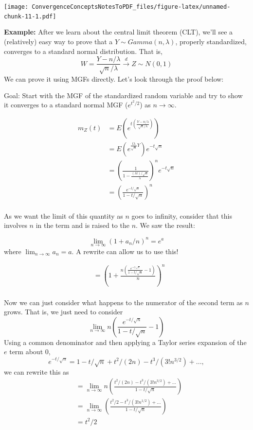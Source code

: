 \documentclass[
]{article}
\begin{document}
\texttt{[image: ConvergenceConceptsNotesToPDF\_files/figure-latex/unnamed-chunk-11-1.pdf]}

\textbf{Example:} After we learn about the central limit theorem (CLT),
we'll see a (relatively) easy way to prove that a
\(Y\sim Gamma(n, \lambda)\), properly standardized, converges to a
standard normal distribution. That is,
\[W = \frac{Y-n/\lambda}{\sqrt{n}/\lambda}\stackrel{d}{\rightarrow} Z \sim N(0,1)\]
We can prove it using MGFs directly. Let's look through the proof below:

Goal: Start with the MGF of the standardized random variable and try to
show it converges to a standard normal MGF (\(e^{t^2/2}\)) as
\(n\rightarrow\infty\).

\begin{align*} 
m_Z(t) &= E\left(e^{t\left(\frac{Y-n/\lambda}{\sqrt{n}/\lambda}\right)}\right)\\
       &= E\left(e^{\frac{t\lambda}{\sqrt{n}}Y}\right)e^{-t\sqrt{n}}\\
       &= \left(\frac{1}{1-\frac{(\lambda t)/\sqrt{n}}{\lambda}}\right)^{n}e^{-t\sqrt{n}}\\
       &= \left(\frac{e^{-t/\sqrt{n}}}{1-t/\sqrt{n}}\right)^{n}\\
\end{align*}

As we want the limit of this quantity as \(n\) goes to infinity,
consider that this involves \(n\) in the term and is raised to the
\(n\). We saw the result:

\[\lim_{n\rightarrow\infty}(1+a_n/n)^n=e^a\] where
\(\lim_{n\rightarrow\infty}a_n=a\). A rewrite can allow us to use this!

\begin{align*}
      &= \left(1+\frac{n\left(\frac{e^{-t/\sqrt{n}}}{1-t/\sqrt{n}}-1\right)}{n}\right)^{n}\\
\end{align*}

Now we can just consider what happens to the numerator of the second
term as \(n\) grows. That is, we just need to consider
\[\lim_{n\rightarrow\infty}n\left(\frac{e^{-t/\sqrt{n}}}{1-t/\sqrt{n}}-1\right)\]
Using a common denominator and then applying a Taylor series expansion
of the \(e\) term about 0,
\[e^{-t/\sqrt{n}}=1-t/\sqrt{n}+t^2/(2n)-t^3/(3!n^{3/2})+...,\] we can
rewrite this as \begin{align*}
    &= \lim_{n\rightarrow\infty}n\left(\frac{t^2/(2n)-t^3/(3!n^{3/2})+...}{1-t/\sqrt{n}}\right)\\
    &= \lim_{n\rightarrow\infty}\left(\frac{t^2/2-t^3/(3!n^{1/2})+...}{1-t/\sqrt{n}}\right)\\
    &= t^2/2\\
\end{align*}
\end{document}
